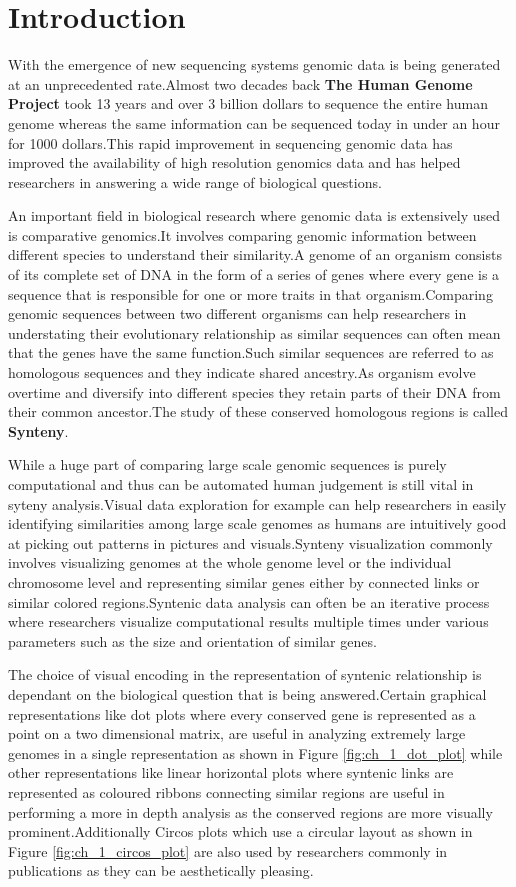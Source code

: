 \chapter{Introduction}

With the emergence of new sequencing systems genomic data is being generated at an unprecedented rate.Almost two decades back \textbf{The Human Genome Project} took 13 years and over 3 billion dollars to sequence the entire human genome whereas the same information can be sequenced today in under an hour for 1000 dollars.This rapid improvement in sequencing genomic data has improved the availability of high resolution genomics data and has helped researchers in answering a wide range of biological questions.

An important field in biological research where genomic data is extensively used is comparative genomics.It involves comparing genomic information between different species to understand their similarity.A genome of an organism consists of its complete set of DNA in the form of a series of genes where every gene is a sequence that is responsible for one or more traits in that organism.Comparing genomic sequences between two different organisms can help researchers in understating their evolutionary relationship as similar sequences can often mean that the genes have the same function.Such similar sequences are referred to as homologous sequences and they indicate shared ancestry.As organism evolve overtime and diversify into different species they retain parts of their DNA from their common ancestor.The study of these conserved homologous regions is called \textbf{Synteny}. 

While a huge part of comparing large scale genomic sequences is purely computational and thus can be automated human judgement is still vital in syteny analysis.Visual data exploration for example can help researchers in easily identifying similarities among large scale genomes as humans are intuitively good at picking out patterns in pictures and visuals.Synteny visualization commonly involves visualizing genomes at the whole genome level or the individual chromosome level and representing similar genes either by connected links or similar colored regions.Syntenic data analysis can often be an iterative process where researchers visualize computational results multiple times under various parameters such as the size and orientation of similar genes.

The choice of visual encoding in the representation of syntenic relationship is dependant on the biological question that is being answered.Certain graphical representations like dot plots where every conserved gene is represented as a point on a two dimensional matrix, are useful in analyzing extremely large genomes in a single representation as shown in Figure \ref{fig:ch_1_dot_plot} while other representations like linear horizontal plots where syntenic links are represented as coloured ribbons connecting similar regions are useful in performing a more in depth analysis as the conserved regions are more visually prominent.Additionally Circos plots which use a circular layout as shown in Figure \ref{fig:ch_1_circos_plot} are also used by researchers commonly in publications as they can be aesthetically pleasing.

